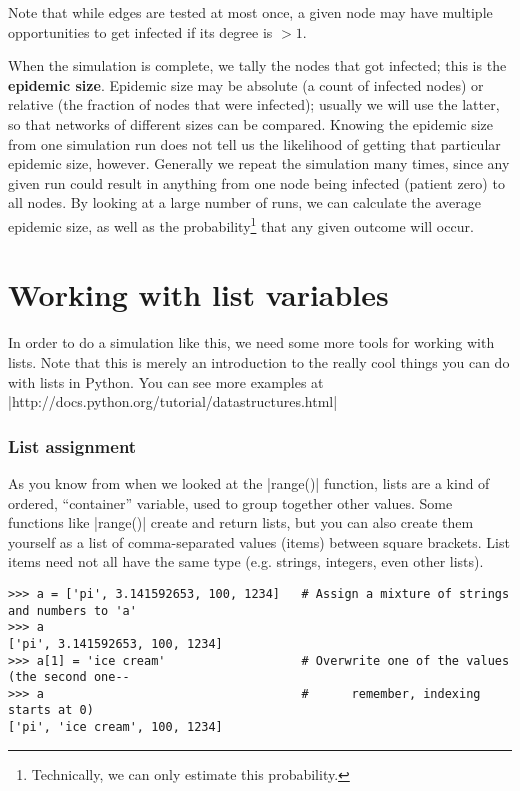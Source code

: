 \documentclass{article}
\begin{document}
Note that while edges are tested at most once, a given node may have multiple
opportunities to get infected if its degree is $>1$.

When the simulation is complete, we tally the nodes that got infected; this is
the \textbf{epidemic size}.  Epidemic size may be absolute (a count of infected
nodes) or relative (the fraction of nodes that were infected); usually we will
use the latter, so that networks of different sizes can be compared.  Knowing
the epidemic size from one simulation run does not tell us the likelihood of
getting that particular epidemic size, however.  Generally we repeat the
simulation many times, since any given run could result in anything from one
node being infected (patient zero) to all nodes.  By looking at a large number
of runs, we can calculate the average epidemic size, as well as the
probability\footnote{Technically, we can only estimate this probability.} that
any given outcome will occur.

\section{Working with list variables}
In order to do a simulation like this, we need some more tools for working with lists.  Note that this is merely an introduction to the 
really cool things you can do with lists in Python.  You can see more examples at |http://docs.python.org/tutorial/datastructures.html|

\subsubsection*{List assignment}
As you know from when we looked at the |range()| function, lists are a kind of ordered, ``container'' variable, used to group together other
values. Some functions like |range()| create and return lists, but you can also create them yourself as a list of
comma-separated values (items) between square brackets. List items need not all
have the same type (e.g. strings, integers, even other lists).

\begin{Verbatim}
>>> a = ['pi', 3.141592653, 100, 1234]   # Assign a mixture of strings and numbers to 'a'
>>> a
['pi', 3.141592653, 100, 1234]
>>> a[1] = 'ice cream'                   # Overwrite one of the values (the second one--
>>> a                                    #      remember, indexing starts at 0)
['pi', 'ice cream', 100, 1234]
\end{Verbatim}
\end{document}
